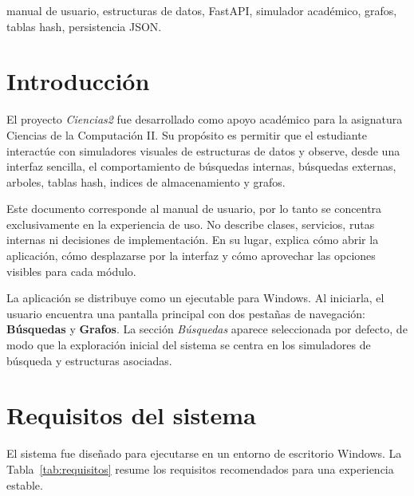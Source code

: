 \documentclass[10pt,onecolumn]{IEEEtran}
\begin{document}
\begin{IEEEkeywords}
manual de usuario, estructuras de datos, FastAPI, simulador académico, grafos, tablas hash, persistencia JSON.
\end{IEEEkeywords}

\newpage
{}
\tableofcontents
\newpage
{}

\section{Introducción}
El proyecto \textit{Ciencias2} fue desarrollado como apoyo académico para la asignatura Ciencias de la Computación II. Su propósito es permitir que el estudiante interactúe con simuladores visuales de estructuras de datos y observe, desde una interfaz sencilla, el comportamiento de búsquedas internas, búsquedas externas, arboles, tablas hash, indices de almacenamiento y grafos.

Este documento corresponde al manual de usuario, por lo tanto se concentra exclusivamente en la experiencia de uso. No describe clases, servicios, rutas internas ni decisiones de implementación. En su lugar, explica cómo abrir la aplicación, cómo desplazarse por la interfaz y cómo aprovechar las opciones visibles para cada módulo.

La aplicación se distribuye como un ejecutable para Windows. Al iniciarla, el usuario encuentra una pantalla principal con dos pestañas de navegación: \textbf{Búsquedas} y \textbf{Grafos}. La sección \textit{Búsquedas} aparece seleccionada por defecto, de modo que la exploración inicial del sistema se centra en los simuladores de búsqueda y estructuras asociadas.

\section{Requisitos del sistema}
El sistema fue diseñado para ejecutarse en un entorno de escritorio Windows. La Tabla~\ref{tab:requisitos} resume los requisitos recomendados para una experiencia estable.
\end{document}
